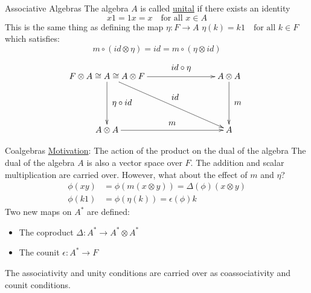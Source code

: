 \documentclass[pdf,colorBG,slideColor,fyma]{prosper}
\begin{document}
 {
\begin{slide}{Associative Algebras}
The algebra $A$ is called \underline{unital} if there exists an identity
\[
x1 = 1x = x \quad \text{for all $x \in A$}
\]
This is the same thing as defining the map $\eta: F \rightarrow A$
$ \eta(k) = k1 \quad \text{for all $k \in F$} $
which satisfies:
\[ m \circ (id \otimes \eta) = id = m \circ (\eta \otimes id) \]
{
    \[
    \xymatrix@R=50pt@C=80pt{
    F \otimes A \cong A \cong A \otimes F
        \ar[r]^-*+{id \circ \eta}
        \ar[d]^-*+{\eta \circ id}
        \ar[dr]^-*+{id} & A \otimes A \ar[d]^-*+{m}\\
    A \otimes A \ar[r]^-*+{m} & A \\
    }
    \]
}
\end{slide}
}

\begin{slide}{Coalgebras}
\underline{Motivation}: The action of the product on the dual of the algebra
\break
\break
The dual of the algebra $A$ is also a vector space over $F$. The addition
and scalar multiplication are carried over. However, what about the effect of $m$
and $\eta$?
\begin{align*}
\phi(xy) &= \phi(m(x \otimes y)) = \Delta(\phi)(x \otimes y) \\
\phi(k1) &= \phi(\eta(k)) = \epsilon(\phi)k
\end{align*}
Two new maps on $A^*$ are defined:
\begin{itemize}
  \item{The coproduct $\Delta: A^* \rightarrow A^* \otimes A^*$}
  \item{The counit $\epsilon: A^* \rightarrow F$}
\end{itemize}
The associativity and unity conditions are carried over as coassociativity
and counit conditions.
\end{slide}

\end{document}
